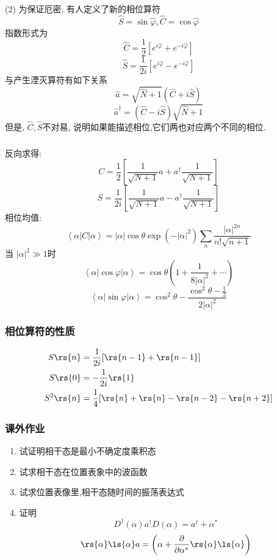 \begin{frame} 
      \frametitle{}
         (2) 为保证厄密, 有人定义了新的相位算符
         \[ \hat{S}=\sin \hat{\varphi}, \hat{C}=\cos \hat{\varphi}\]
         指数形式为
         \[\hat{C}= \frac{1}{2} [e^{i \hat{\varphi}} + e^{- i \hat{\varphi}}]\]
         \[\hat{S}= \frac{1}{2i} [e^{i \hat{\varphi}} - e^{- i \hat{\varphi}}]\]
         与产生湮灭算符有如下关系
         \[\hat{a}= \sqrt{\hat{N}+1}(\hat{C}+i\hat{S})\]
         \[\hat{a}^{\dagger}= (\hat{C}-i\hat{S})\sqrt{\hat{N}+1}\]
         但是, $\hat{C}, \hat{S}$不对易, 说明如果能描述相位,它们两也对应两个不同的相位.\\ 
         
\end{frame}

\begin{frame} 
 \frametitle{}
 反向求得:
         \[ C= \frac{1}{2}\left[ \frac{1}{\sqrt{N+1}}a + a^{\dagger}  \frac{1}{\sqrt{N+1}}\right]\]
         \[ S= \frac{1}{2i}\left[ \frac{1}{\sqrt{N+1}}a - a^{\dagger}  \frac{1}{\sqrt{N+1}}\right] \]
相位均值:
      \[  \left\langle \alpha |C| \alpha   \right\rangle = \left|\alpha\right|\cos\theta \exp(-\left|\alpha\right|^2) \sum_n \frac{\left|\alpha\right|^{2n}}{n! \sqrt{n+1}} \]
      当 $\left|\alpha\right|^2\gg 1$时
      \[  \left\langle \alpha |\cos \varphi| \alpha   \right\rangle = \cos \theta (1+ \frac{1}{8\left|\alpha\right|^2}+ \cdots )\]
      \[  \left\langle \alpha |\sin \varphi| \alpha   \right\rangle = \cos^2 \theta -\frac{\cos^2 \theta -\frac{1}{2}}{2\left|\alpha\right|^2 } \]
\end{frame}

\begin{frame} 
 \frametitle{相位算符的性质}
 \[ \begin{aligned}
     S \rs{n} &= \frac{1}{2i} [\rs{n-1}+\rs{n-1}]\\
     S \rs{0} &=-\frac{1}{2i} \rs{1}\\
     S^2 \rs{n}&= \frac{1}{4} [\rs{n}+\rs{n}- \rs{n-2}-\rs{n+2}] \\  
 \end{aligned}\] 
      
\end{frame}
\begin{frame}
    \frametitle{课外作业}
    \begin{enumerate}
        \item 试证明相干态是最小不确定度乘积态
        \item 试求相干态在位置表象中的波函数
        \item 试求位置表像里,相干态随时间的振荡表达式
        \item 证明
        \[D^\dagger (\alpha) a^\dagger D (\alpha) = a^\dagger + \alpha^* \]
        \[ \rs{\alpha }\ls{\alpha } a= \left( \alpha + \frac{\partial }{\partial \alpha^*} \rs{\alpha }\ls{\alpha } \right)\]
    \end{enumerate}
\end{frame}
